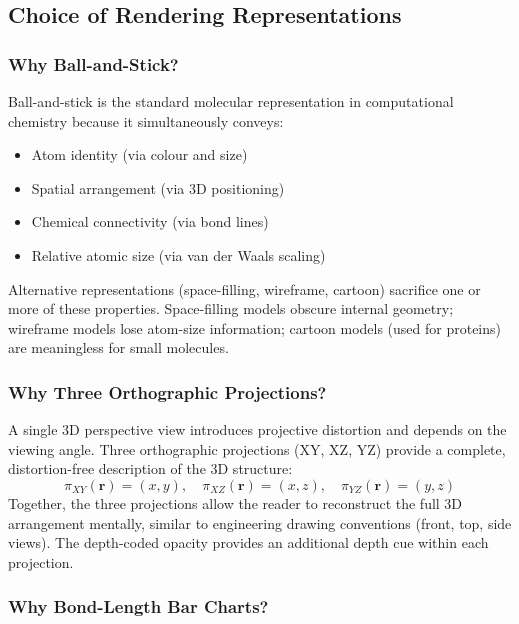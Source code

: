 \documentclass[11pt,a4paper]{article}
\begin{document}
\subsection{Choice of Rendering Representations}

\subsubsection{Why Ball-and-Stick?}

Ball-and-stick is the standard molecular representation in computational
chemistry because it simultaneously conveys:
\begin{itemize}
  \item Atom identity (via colour and size)
  \item Spatial arrangement (via 3D positioning)
  \item Chemical connectivity (via bond lines)
  \item Relative atomic size (via van der Waals scaling)
\end{itemize}
Alternative representations (space-filling, wireframe, cartoon) sacrifice
one or more of these properties.  Space-filling models obscure internal
geometry; wireframe models lose atom-size information; cartoon models
(used for proteins) are meaningless for small molecules.

\subsubsection{Why Three Orthographic Projections?}

A single 3D perspective view introduces projective distortion and
depends on the viewing angle.  Three orthographic projections (XY, XZ,
YZ) provide a complete, distortion-free description of the 3D structure:
\begin{equation}
  \pi_{XY}(\mathbf{r}) = (x, y), \quad
  \pi_{XZ}(\mathbf{r}) = (x, z), \quad
  \pi_{YZ}(\mathbf{r}) = (y, z)
\end{equation}
Together, the three projections allow the reader to reconstruct the
full 3D arrangement mentally, similar to engineering drawing conventions
(front, top, side views).  The depth-coded opacity provides an
additional depth cue within each projection.

\subsubsection{Why Bond-Length Bar Charts?}
\end{document}
